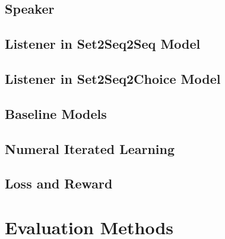 \subsection{Speaker}
\label{ssec3.2.1:speaker}

\subsection{Listener in Set2Seq2Seq Model}
\label{ssec3.2.2:set2seq2seq}

\subsection{Listener in Set2Seq2Choice Model}
\label{ssec3.2.3:set2seq2choice}

\subsection{Baseline Models}
\label{ssec3.2.4:baselines}

\subsection{Numeral Iterated Learning}
\label{ssec3.2.5:iterated_learning}

\subsection{Loss and Reward}
\label{ssec3.2.6:loss_reward}

\section{Evaluation Methods}
\label{sec3.3:evaluation}

